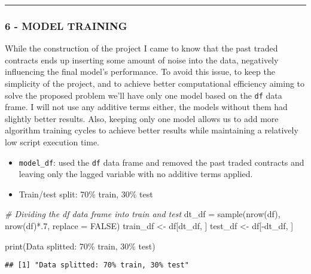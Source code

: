\documentclass[
]{article}
\newenvironment{Shaded}{\begin{snugshade}}{\end{snugshade}}
\newcommand{\AttributeTok}[1]{\textcolor[rgb]{0.77,0.63,0.00}{#1}}
\newcommand{\CommentTok}[1]{\textcolor[rgb]{0.56,0.35,0.01}{\textit{#1}}}
\newcommand{\ConstantTok}[1]{\textcolor[rgb]{0.00,0.00,0.00}{#1}}
\newcommand{\DecValTok}[1]{\textcolor[rgb]{0.00,0.00,0.81}{#1}}
\newcommand{\FunctionTok}[1]{\textcolor[rgb]{0.00,0.00,0.00}{#1}}
\newcommand{\NormalTok}[1]{#1}
\newcommand{\OtherTok}[1]{\textcolor[rgb]{0.56,0.35,0.01}{#1}}
\newcommand{\SpecialCharTok}[1]{\textcolor[rgb]{0.00,0.00,0.00}{#1}}
\newcommand{\StringTok}[1]{\textcolor[rgb]{0.31,0.60,0.02}{#1}}
\begin{document}
\begin{center}\rule{0.5\linewidth}{0.5pt}\end{center}

\hypertarget{model-training}{%
\subsubsection{6 - MODEL TRAINING}\label{model-training}}

While the construction of the project I came to know that the past
traded contracts ends up inserting some amount of noise into the data,
negatively influencing the final model's performance. To avoid this
issue, to keep the simplicity of the project, and to achieve better
computational efficiency aiming to solve the proposed problem we'll have
only one model based on the \texttt{df} data frame. I will not use any
additive terms either, the models without them had slightly better
results. Also, keeping only one model allows us to add more algorithm
training cycles to achieve better results while maintaining a relatively
low script execution time.

\begin{itemize}
\item
  \texttt{model\_df}: used the \texttt{df} data frame and removed the
  past traded contracts and leaving only the lagged variable with no
  additive terms applied.
\item
  Train/test split: 70\% train, 30\% test
\end{itemize}

\begin{Shaded}
\begin{Highlighting}[]
\CommentTok{\# Dividing the \textquotesingle{}df\textquotesingle{} data frame into train and test}
\NormalTok{dt\_df }\OtherTok{=} \FunctionTok{sample}\NormalTok{(}\FunctionTok{nrow}\NormalTok{(df), }\FunctionTok{nrow}\NormalTok{(df)}\SpecialCharTok{*}\NormalTok{.}\DecValTok{7}\NormalTok{, }\AttributeTok{replace =} \ConstantTok{FALSE}\NormalTok{)}
\NormalTok{train\_df }\OtherTok{\textless{}{-}}\NormalTok{ df[dt\_df, ]}
\NormalTok{test\_df }\OtherTok{\textless{}{-}}\NormalTok{ df[}\SpecialCharTok{{-}}\NormalTok{dt\_df, ]}

\FunctionTok{print}\NormalTok{(}\StringTok{\textquotesingle{}Data splitted: 70\% train, 30\% test\textquotesingle{}}\NormalTok{)}
\end{Highlighting}
\end{Shaded}

\begin{verbatim}
## [1] "Data splitted: 70% train, 30% test"
\end{verbatim}
\end{document}
